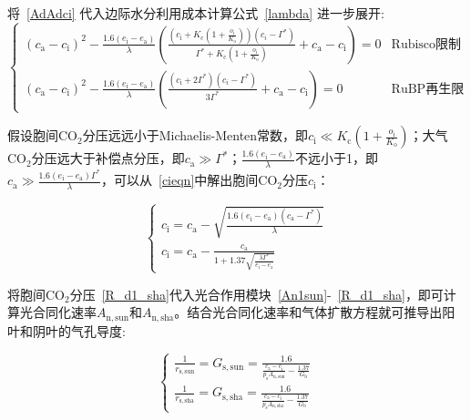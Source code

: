 将~\eqref{AdAdci} 代入边际水分利用成本计算公式~\eqref{lambda} 进一步展开:
\begin{equation}\label{cieqn}
\begin{cases}
    \left(c_{\mathrm{a}}-c_{\mathrm{i}}\right)^2-\frac{1.6\left(e_{\mathrm{i}}-e_{\mathrm{a}}\right)}{\lambda}\left(\frac{\left(c_{\mathrm{i}}+K_{\mathrm{c}}\left(1+\frac{o_{\mathrm{i}}}{K_{\mathrm{o}}}\right)\right)\left(c_i-\Gamma^*\right)}{\Gamma^*+K_{\mathrm{c}}\left(1+\frac{o_{\mathrm{i}}}{K_{\mathrm{o}}}\right)}+c_{\mathrm{a}}-c_{\mathrm{i}}\right)=0 & \text{Rubisco限制}  \\
    \left(c_{\mathrm{a}}-c_{\mathrm{i}}\right)^2-\frac{1.6\left(e_{\mathrm{i}}-e_{\mathrm{a}}\right)}{\lambda}\left(\frac{\left(c_{\mathrm{i}}+2\Gamma^*\right)\left(c_i-\Gamma^*\right)}{3\Gamma^*}+c_{\mathrm{a}}-c_{\mathrm{i}}\right)=0  & \text{RuBP再生限制}
\end{cases}
\end{equation}

假设胞间$\mathrm {CO_2}$分压远远小于Michaelis-Menten常数，即$c_{\mathrm{i}}\ll K_{\mathrm{c}}\left(1+\frac{o_{\mathrm{i}}}{K_{\mathrm{o}}}\right)$；大气$\mathrm {CO_2}$分压远大于补偿点分压，即$c_{\mathrm{a}}\gg\Gamma^*$；$\frac{1.6\left(e_{\mathrm{i}}-e_{\mathrm{a}}\right)}{\lambda}$不远小于1，即$c_{\mathrm{a}}\gg\frac{1.6\left(e_{\mathrm{i}}-e_{\mathrm{a}}\right)\Gamma^*}{\lambda}$，可以从~\eqref{cieqn}中解出胞间$\mathrm {CO_2}$分压$c_{\mathrm{i}}$：

\begin{equation}\label{cisolu}
    \begin{cases}
    c_{\mathrm{i}}=c_{\mathrm{a}} - \sqrt{\frac{1.6\left(e_{\mathrm{i}}-e_{\mathrm{a}}\right)\left(c_{\mathrm{a}}-\Gamma^*\right)}{\lambda}} \\
    c_{\mathrm{i}}=c_{\mathrm{a}} - \frac{c_{\mathrm{a}}}{1+1.37\sqrt{\frac{\lambda \Gamma^*}{e_{\mathrm{i}}-e_{\mathrm{a}}}}}
    \end{cases}
\end{equation}

将胞间$\mathrm {CO_2}$分压~\eqref{R_d1_sha}代入光合作用模块~\eqref{An1sun}-~\eqref{R_d1_sha}，即可计算光合同化速率$A_{\mathrm{n,sun}}$和$A_{\mathrm{n,sha}}$。结合光合同化速率和气体扩散方程就可推导出阳叶和阴叶的气孔导度:

\begin{equation}\label{gssolu}
    \begin{cases}
    \frac{1}{r_{\mathrm{s,sun}}}=G_{\mathrm{s,sun}}=\frac{1.6} {\frac{c_{\mathrm{a}}-c_{\mathrm{i}}}{p_{\mathrm{s}} A_{\mathrm{n,sun}}} - \frac{1.37}{G_{\mathrm{b}}}}\\
    \frac{1}{r_{\mathrm{s,sha}}}=G_{\mathrm{s,sha}}=\frac{1.6} {\frac{c_{\mathrm{a}}-c_{\mathrm{i}}}{p_{\mathrm{s}} A_{\mathrm{n,sha}}} - \frac{1.37}{G_{\mathrm{b}}}}
    \end{cases}
\end{equation}


